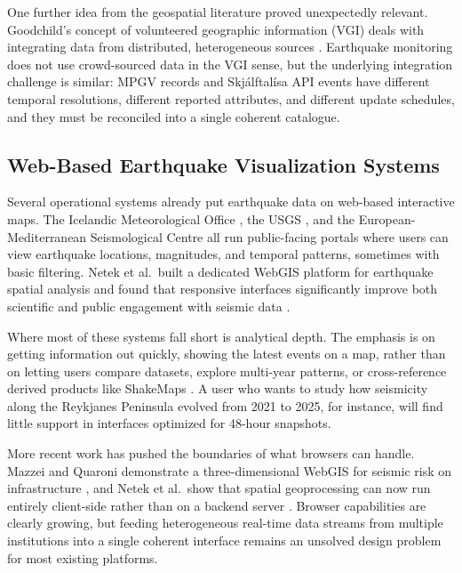 \documentclass[12pt]{article}
\begin{document}
One further idea from the geospatial literature proved unexpectedly relevant. Goodchild's concept of volunteered geographic information (VGI) deals with integrating data from distributed, heterogeneous sources \cite{Goodchild2007Citizens}. Earthquake monitoring does not use crowd-sourced data in the VGI sense, but the underlying integration challenge is similar: MPGV records and Skjálftalísa API events have different temporal resolutions, different reported attributes, and different update schedules, and they must be reconciled into a single coherent catalogue.

\subsection{Web-Based Earthquake Visualization Systems}

Several operational systems already put earthquake data on web-based interactive maps. The Icelandic Meteorological Office \cite{imo_quakes_48h}, the USGS \cite{usgs_latest_map}, and the European-Mediterranean Seismological Centre \cite{emsc_home} all run public-facing portals where users can view earthquake locations, magnitudes, and temporal patterns, sometimes with basic filtering. Netek et al.\ built a dedicated WebGIS platform for earthquake spatial analysis and found that responsive interfaces significantly improve both scientific and public engagement with seismic data \cite{Netek2018}.

Where most of these systems fall short is analytical depth. The emphasis is on getting information out quickly, showing the latest events on a map, rather than on letting users compare datasets, explore multi-year patterns, or cross-reference derived products like ShakeMaps \cite{Netek2018, Roth2013Interactive}. A user who wants to study how seismicity along the Reykjanes Peninsula evolved from 2021 to 2025, for instance, will find little support in interfaces optimized for 48-hour snapshots.

More recent work has pushed the boundaries of what browsers can handle. Mazzei and Quaroni demonstrate a three-dimensional WebGIS for seismic risk on infrastructure \cite{Mazzei2022}, and Netek et al.\ show that spatial geoprocessing can now run entirely client-side rather than on a backend server \cite{Netek2023}. Browser capabilities are clearly growing, but feeding heterogeneous real-time data streams from multiple institutions into a single coherent interface remains an unsolved design problem for most existing platforms.
\end{document}
